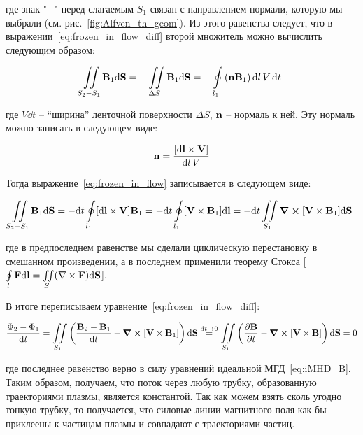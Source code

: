 \documentclass[10pt, a4paper]{article}
\begin{document}
где знак "$-$" перед слагаемым $S_1$ связан с направлением нормали, которую мы выбрали (см. рис.~\ref{fig:Alfven_th_geom}). Из этого равенства следует, что в выражении~\eqref{eq:frozen_in_flow_diff} второй множитель можно вычислить следующим образом:

\begin{equation} \label{eq:frozen_in_flow}	
	\iint\limits_{S_2 - S_1}\vb{B}_1\dd\vb{S} = -\iint\limits_{\Delta S} \vb{B}_1\dd\vb{S} = -\oint\limits_{l_1} \left( \vb{n}\vb{B}_1 \right) \dd l\,V\,\dd t
\end{equation}

где $V\dd t$ -- ``ширина'' ленточной поверхности $\Delta S$, $\vb{n}$ -- нормаль к ней. Эту нормаль можно записать в следующем виде:

\begin{equation*}
	\vb{n} = \frac{[\dd\vb{l}\times\vb{V}]}{\dd l\, V}
\end{equation*}

Тогда выражение~\eqref{eq:frozen_in_flow} записывается в следующем виде:

\begin{equation*}
	\iint\limits_{S_2 - S_1}\vb{B}_1\dd\vb{S} = -\dd t \oint\limits_{l_1} [\dd\vb{l}\times\vb{V}]\vb{B}_1 = -\dd t \oint\limits_{l_1} [\vb{V}\times\vb{B}_1]\dd\vb{l} = -\dd t\iint\limits_{S_1}\curl[\vb{V}\times\vb{B}_1] \dd\vb{S}
\end{equation*}

где в предпоследнем равенстве мы сделали циклическую перестановку в смешанном произведении, а в последнем применили теорему Стокса [$\oint\limits_{l} \vb{F} \dd\vb{l} = \iint\limits_S (\nabla
\times\vb{F})\dd\vb{S}$].

В итоге переписываем уравнение~\eqref{eq:frozen_in_flow_diff}:

\begin{equation*}
	\frac{\Phi_2 - \Phi_1}{\dd t} = \iint\limits_{S_1}\left( \frac{\vb{B}_2 - \vb{B}_1}{\dd t} - \curl[\vb{V}\times\vb{B}_1] \right)\dd\vb{S} \stackrel{\dd t\rightarrow 0}{=} \iint\limits_{S_1}\left( \pdv{\vb{B}}{t} - \curl[\vb{V}\times\vb{B}] \right)\dd\vb{S} = 0
\end{equation*}

где последнее равенство верно в силу уравнений идеальной МГД~\eqref{eq:iMHD_B}. Таким образом, получаем, что поток через любую трубку, образованную траекториями плазмы, является константой. Так как можем взять сколь угодно тонкую трубку, то получается, что силовые линии магнитного поля как бы приклеены к частицам плазмы и совпадают с траекториями частиц.
\end{document}
